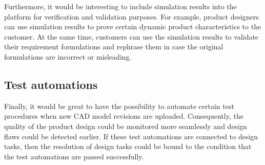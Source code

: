 Furthermore, it would be interesting to include simulation results into the platform for verification and validation purposes.
For example, product designers can use simulation results to prove certain dynamic product characteristics to the customer.
At the same time, customers can use the simulation results to validate their requirement formulations and rephrase them in case the original formulations are incorrect or misleading.

\subsection{Test automations}

Finally, it would be great to have the possibility to automate certain test procedures when new CAD model revisions are uploaded.
Consequently, the quality of the product design could be monitored more seamlessly and design flaws could be detected earlier.
If these test automations are connected to design tasks, then the resolution of design tasks could be bound to the condition that the test automations are passed successfully.
